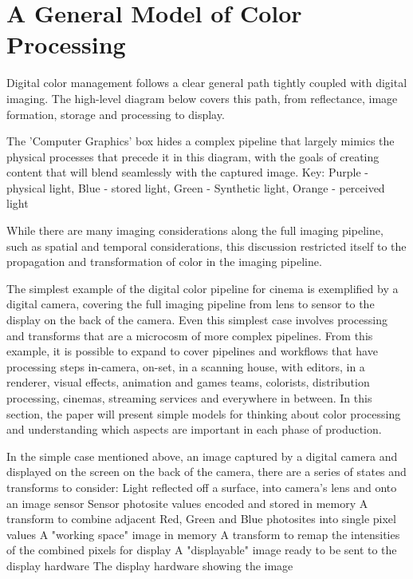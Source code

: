 \section{A General Model of Color Processing}%
\label{sec:a-general-model-of-color-processing}

Digital color management follows a clear general path tightly coupled with digital imaging. The high-level diagram below covers this path, from reflectance, image formation, storage and processing to display.

The 'Computer Graphics' box hides a complex pipeline that largely mimics the physical processes that precede it in this diagram, with the goals of creating content that will blend seamlessly with the captured image. Key: Purple - physical light, Blue - stored light, Green - Synthetic light, Orange - perceived light

While there are many imaging considerations along the full imaging pipeline, such as spatial and temporal considerations, this discussion restricted itself to the propagation and transformation of color in the imaging pipeline.

The simplest example of the digital color pipeline for cinema is exemplified by a digital camera, covering the full imaging pipeline from lens to sensor to the display on the back of the camera. Even this simplest case involves processing and transforms that are a microcosm of more complex pipelines. From this example, it is possible to expand to cover pipelines and workflows that have processing steps in-camera, on-set, in a scanning house, with editors, in a renderer, visual effects, animation and games teams, colorists, distribution processing, cinemas, streaming services and everywhere in between. In this section, the paper will present simple models for thinking about color processing and understanding which aspects are important in each phase of production.

In the simple case mentioned above, an image captured by a digital camera and displayed on the screen on the back of the camera, there are a series of states and transforms to consider:
Light reflected off a surface, into camera's lens and onto an image sensor
Sensor photosite values encoded and stored in memory
A transform to combine adjacent Red, Green and Blue photosites into single pixel values
A "working space" image in memory
A transform to remap the intensities of the combined pixels for display
A "displayable" image ready to be sent to the display hardware
The display hardware showing the image


